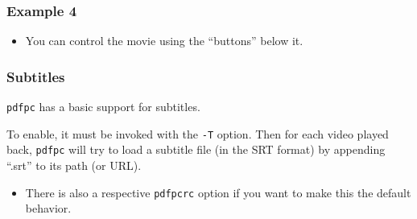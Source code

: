 \documentclass{beamer}
\newcommand{\singleitem}[1]{\begin{itemize}\item #1\end{itemize}}
\newcommand{\pdfpc}{\texttt{pdfpc}\xspace}
\newcommand{\opt}[1]{\texttt{#1}\xspace}
\begin{document}
\begin{frame}
  \frametitle{Example 4}
  \vspace{10pt}
  \begin{center}

  \end{center}

  \vfill
  \singleitem{You can control the movie using the ``buttons'' below it.}
\end{frame}


\begin{frame}
  \frametitle{Subtitles}

  \pdfpc has a basic support for subtitles. 
  
  \vspace{10pt}

  To enable, it must be invoked with the \opt{-T} option. Then for each video
  played back, \pdfpc will try to load a subtitle file (in the SRT format) by
  appending ``.srt'' to its path (or URL).
  
  \singleitem{There is also a respective \opt{pdfpcrc} option if you want to
    make this the default behavior.}
\end{frame}
\end{document}

